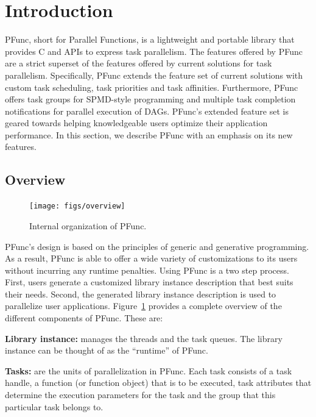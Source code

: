 \section{Introduction}
\label{sec:introduction}

PFunc, short for Parallel Functions, is a lightweight and portable library that
provides C and \Cpp{} APIs to express task parallelism. The features offered by
PFunc are a strict superset of the features offered by current solutions for
task parallelism.  Specifically, PFunc extends the feature set of current
solutions with custom task scheduling, task priorities and task affinities.
Furthermore, PFunc offers task groups for SPMD-style programming and multiple
task completion notifications for parallel execution of DAGs.  PFunc's extended
feature set is geared towards helping knowledgeable users optimize their
application performance. In this section, we describe PFunc with an emphasis on
its new features.  

\subsection{Overview}
\label{sec:design}

\begin{figure}[t]
\centering
\texttt{[image: figs/overview]}
\caption{Internal organization of PFunc.}
\label{fig:overview}
\end{figure}

PFunc's design is based on the principles of generic and generative
programming. As a result, PFunc is able to offer a wide variety of
customizations to its users without incurring any runtime penalties.  Using
PFunc is a two step process. First, users generate a customized library
instance description that best suits their needs.  Second, the generated
library instance description is used to parallelize user applications.
Figure~\ref{fig:overview} provides a complete overview of the different 
components of PFunc. These are:

\begin{list}{}{\leftmargin=1em}
\item \textbf{Library instance:}
manages the threads and the task queues. The library instance can be thought of
as the ``runtime'' of PFunc.
\item \textbf{Tasks:}
are the units of parallelization in PFunc. Each task consists of a task handle,
a function (or function object) that is to be executed, task attributes that 
determine the execution parameters for the task and the group that this 
particular task belongs to.
\end{list}

